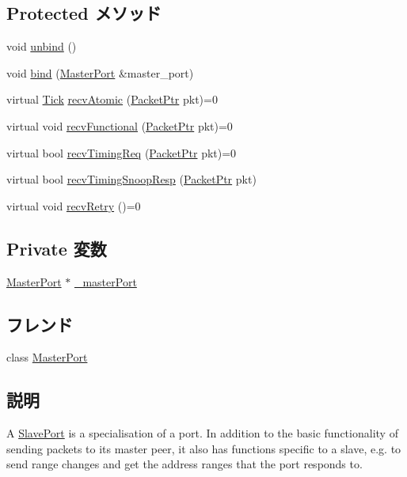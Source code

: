 \subsection*{Protected メソッド}
\begin{DoxyCompactItemize}
\item 
void \hyperlink{classSlavePort_af294915156f1e30f1d2e574dccc87945}{unbind} ()
\item 
void \hyperlink{classSlavePort_ad7992aad912bd9f1bf4774673a7980e1}{bind} (\hyperlink{classMasterPort}{MasterPort} \&master\_\-port)
\item 
virtual \hyperlink{base_2types_8hh_a5c8ed81b7d238c9083e1037ba6d61643}{Tick} \hyperlink{classSlavePort_a428ab07671bc9372dc44a2487b12a726}{recvAtomic} (\hyperlink{classPacket}{PacketPtr} pkt)=0
\item 
virtual void \hyperlink{classSlavePort_a6a3d6f2e5dab6bed16d53d9e7c17378d}{recvFunctional} (\hyperlink{classPacket}{PacketPtr} pkt)=0
\item 
virtual bool \hyperlink{classSlavePort_abcece77e42f88ee41af8d3d01bb48253}{recvTimingReq} (\hyperlink{classPacket}{PacketPtr} pkt)=0
\item 
virtual bool \hyperlink{classSlavePort_ae808ca0180bf333d9072270ed66f17fe}{recvTimingSnoopResp} (\hyperlink{classPacket}{PacketPtr} pkt)
\item 
virtual void \hyperlink{classSlavePort_ac1ccc3bcf7ebabb20b57fab99b2be5b0}{recvRetry} ()=0
\end{DoxyCompactItemize}
\subsection*{Private 変数}
\begin{DoxyCompactItemize}
\item 
\hyperlink{classMasterPort}{MasterPort} $\ast$ \hyperlink{classSlavePort_a5e0f39f8e39e5b4c3dcf0991c627489b}{\_\-masterPort}
\end{DoxyCompactItemize}
\subsection*{フレンド}
\begin{DoxyCompactItemize}
\item 
class \hyperlink{classSlavePort_a6c830d413286a218b881eaca621285e4}{MasterPort}
\end{DoxyCompactItemize}


\subsection{説明}
A \hyperlink{classSlavePort}{SlavePort} is a specialisation of a port. In addition to the basic functionality of sending packets to its master peer, it also has functions specific to a slave, e.g. to send range changes and get the address ranges that the port responds to. 

